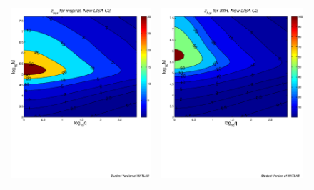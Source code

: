 \documentclass{iopart}
\begin{document}
\begin{figure}[H]
\begin{center}
\begin{tabular}{cc}
\includegraphics[scale=0.41,clip=true]{FigEmanuele/C2InspZhorContour.ps}
&\includegraphics[scale=0.41,clip=true]{FigEmanuele/C2IMRZhorContour.ps}\\

\end{tabular}
\end{center}
\end{figure}
\end{document}
